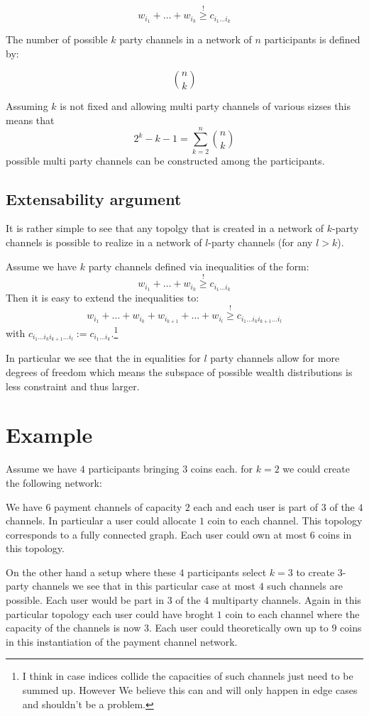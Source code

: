 \documentclass[10pt,twocolumn]{article}
\begin{document}
$$w_{i_1}+\dots+w_{i_k} \stackrel{!}{\geq} c_{i_1\dots i_k}$$

The number of possible $k$ party channels in a network of $n$ participants is defined by:

$${{n}\choose {k}}$$

Assuming $k$ is not fixed and allowing multi party channels of various sizses this means that
$$2^k - k -1 = \sum_{k=2}^n{{n} \choose{k}}$$
possible multi party channels can be constructed among the participants.

\subsection{Extensability argument}
It is rather simple to see that any topolgy that is created in a network of $k$-party channels is possible to realize in a network of $l$-party channels (for any $l>k$).

Assume we have $k$ party channels defined via inequalities of the form:
$$w_{i_1}+\dots+w_{i_k} \stackrel{!}{\geq} c_{i_1\dots i_k}$$
Then it is easy to extend the inequalities to:
$$w_{i_1}+\dots+w_{i_k}+w_{i_{k+1}}+\dots+w_{i_{l}} \stackrel{!}{\geq} c_{i_1\dots i_ki_{k+1}\dots i_{l}}$$
with $c_{i_1\dots i_ki_{k+1}\dots i_{l}} := c_{i_1\dots i_k}$.\footnote{I think in case indices collide the capacities of such channels just need to be summed up. However We believe this can and will only happen in edge cases and shouldn't be a problem.}

In particular we see that the in equalities for $l$ party channels allow for more degrees of freedom which means the subspace of possible wealth distributions is less constraint and thus larger.



\section{Example}
Assume we have $4$ participants bringing $3$ coins each. for $k=2$ we could create the following network:

We have $6$ payment channels of capacity $2$ each and each user is part of $3$ of the $4$ channels.
In particular a user could allocate $1$ coin to each channel.
This topology corresponds to a fully connected graph.
Each user could own at most $6$ coins in this topology.

On the other hand a setup where these $4$ participants select $k=3$ to create $3$-party channels we see that in this particular case at most $4$ such channels are possible.
Each user would be part in $3$ of the $4$ multiparty channels.
Again in this particular topology each user could have broght $1$ coin to each channel where the capacity of the channels is now $3$.
Each user could theoretically own up to $9$ coins in this instantiation of the payment channel network.
\end{document}
